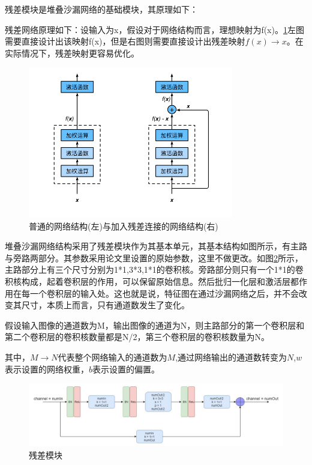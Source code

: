 残差模块是堆叠沙漏网络的基础模块，其原理如下：

残差网络原理如下：设输入为x，假设对于网络结构而言，理想映射为f(x)。\ref{Res_module}左图需要直接设计出该映射f(x)，但是右图则需要直接设计出残差映射$f(x) \to x$。在实际情况下，残差映射更容易优化。

\begin{figure}[h]
	\includegraphics[width=0.8\textwidth]{pic/Res_module.jpg}
	\caption{普通的网络结构(左)与加入残差连接的网络结构(右)}
	\label{Res_module}
\end{figure}

堆叠沙漏网络结构采用了残差模块作为其基本单元，其基本结构如图所示，有主路与旁路两部分。其参数采用论文里设置的原始参数，这里不做更改。如图\ref{res_net}所示，主路部分上有三个尺寸分别为1*1,3*3,1*1的卷积核。旁路部分则只有一个1*1的卷积核构成，起着卷积层的作用，可以保留原始信息。然后批归一化层和激活层都作用在每一个卷积层的输入处。这也就是说，特征图在通过沙漏网络之后，并不会改变其尺寸，本质上而言，只有通道数发生了变化。

假设输入图像的通道数为M，输出图像的通道为N，则主路部分的第一个卷积层和第二个卷积层的卷积核数量都是N/2，第三个卷积层的卷积核数量为N。

其中，$M \to N$代表整个网络输入的通道数为$M$,通过网络输出的通道数转变为$N$,$w$表示设置的网络权重，$b$表示设置的偏置。

\begin{figure}[h]
	\includegraphics[width=\textwidth]{pic/res_net.jpg}
	\caption{残差模块}
	\label{res_net}
\end{figure}

